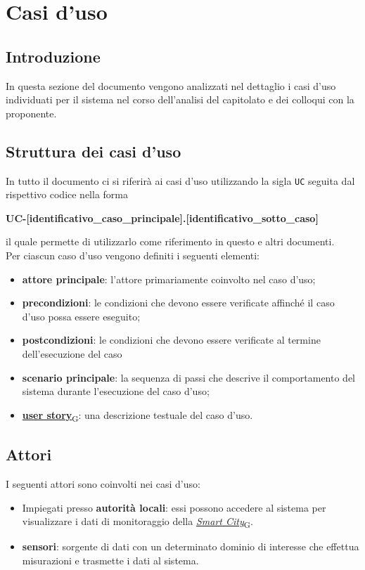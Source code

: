 \section{Casi d'uso}
\subsection{Introduzione}
In questa sezione del documento vengono analizzati nel dettaglio i casi d'uso individuati per il sistema
nel corso dell'analisi del capitolato e dei colloqui con la proponente.

\subsection{Struttura dei casi d'uso}
In tutto il documento ci si riferirà ai casi d'uso utilizzando la sigla \texttt{UC} seguita dal rispettivo codice nella forma
\begin{center}
	\textbf{UC-[identificativo\_caso\_principale].[identificativo\_sotto\_caso]}
\end{center}
il quale permette di utilizzarlo come riferimento in questo e altri documenti.\\
Per ciascun caso d'uso vengono definiti i seguenti elementi:
\begin{itemize}
	\item \textbf{attore principale}: l'attore primariamente coinvolto nel caso d'uso;
	\item \textbf{precondizioni}: le condizioni che devono essere verificate affinché il caso d'uso possa essere
	      eseguito;
	\item \textbf{postcondizioni}: le condizioni che devono essere verificate al termine dell'esecuzione del caso
	\item \textbf{scenario principale}: la sequenza di passi che descrive il comportamento del sistema durante
	      l'esecuzione del caso d'uso;
	\item \href{https://7last.github.io/docs/rtb/documentazione-interna/glossario\#user-story}{\textbf{user story}\textsubscript{G}}: una descrizione testuale del caso d'uso.
\end{itemize}


\subsection{Attori}
I seguenti attori sono coinvolti nei casi d'uso:
\begin{itemize}
	\item Impiegati presso \textbf{autorità locali}: essi possono accedere al sistema per visualizzare i dati di
	      monitoraggio della \href{https://7last.github.io/docs/rtb/documentazione-interna/glossario\#smart-city}{\textit{Smart City}\textsubscript{G}}.
	\item \textbf{sensori}: sorgente di dati con un determinato dominio di interesse che effettua misurazioni
	      e trasmette i dati al sistema.
\end{itemize}

